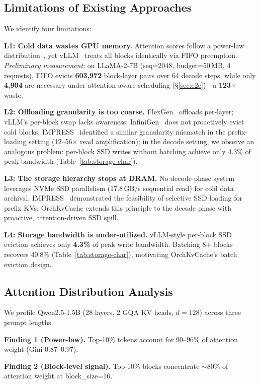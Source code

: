 \documentclass[conference]{IEEEtran}
\begin{document}
\subsection{Limitations of Existing Approaches}

We identify four limitations:

\textbf{L1: Cold data wastes GPU memory.} Attention scores follow a power-law distribution~\cite{h2o,scissorhands}, yet vLLM~\cite{vllm} treats all blocks identically via FIFO preemption. \emph{Preliminary measurement}: on LLaMA-2-7B (seq=2048, budget=50\,MB, 4 requests), FIFO evicts \textbf{603{,}972} block-layer pairs over 64 decode steps, while only \textbf{4{,}904} are necessary under attention-aware scheduling (\S\ref{sec:e2e})---a \textbf{123$\times$} waste.

\textbf{L2: Offloading granularity is too coarse.} FlexGen~\cite{flexgen} offloads per-layer; vLLM's per-block swap lacks awareness; InfiniGen~\cite{infinigen} does not proactively evict cold blocks. IMPRESS~\cite{impress} identified a similar granularity mismatch in the prefix-loading setting (12--56$\times$ read amplification); in the decode setting, we observe an analogous problem: per-block SSD writes without batching achieve only 4.3\% of peak bandwidth (Table~\ref{tab:storage-char}).

\textbf{L3: The storage hierarchy stops at DRAM.} No decode-phase system leverages NVMe SSD parallelism (17.8\,GB/s sequential read) for cold data archival. IMPRESS~\cite{impress} demonstrated the feasibility of selective SSD loading for prefix KVs; OrchKvCache extends this principle to the decode phase with proactive, attention-driven SSD spill.

\textbf{L4: Storage bandwidth is under-utilized.} vLLM-style per-block SSD eviction achieves only \textbf{4.3\%} of peak write bandwidth. Batching 8+ blocks recovers 40.8\% (Table~\ref{tab:storage-char}), motivating OrchKvCache's batch eviction design.

\subsection{Attention Distribution Analysis}

We profile Qwen2.5-1.5B (28 layers, 2 GQA KV heads, $d{=}128$) across three prompt lengths.

\textbf{Finding 1 (Power-law).} Top-10\% tokens account for 90--96\% of attention weight (Gini 0.87--0.97).

\textbf{Finding 2 (Block-level signal).} Top-10\% blocks concentrate ${\sim}$80\% of attention weight at block\_size=16.
\end{document}
